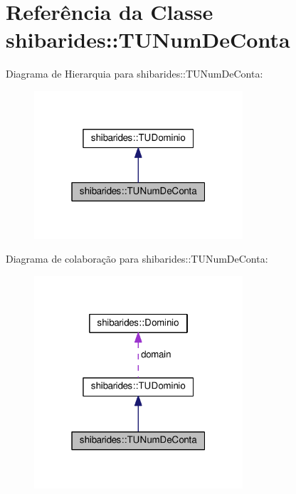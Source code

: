\hypertarget{classshibarides_1_1TUNumDeConta}{}\section{Referência da Classe shibarides\+:\+:T\+U\+Num\+De\+Conta}
\label{classshibarides_1_1TUNumDeConta}


Diagrama de Hierarquia para shibarides\+:\+:T\+U\+Num\+De\+Conta\+:\nopagebreak
\begin{figure}[H]
\begin{center}
\leavevmode
\includegraphics[width=220pt]{classshibarides_1_1TUNumDeConta__inherit__graph}
\end{center}
\end{figure}


Diagrama de colaboração para shibarides\+:\+:T\+U\+Num\+De\+Conta\+:\nopagebreak
\begin{figure}[H]
\begin{center}
\leavevmode
\includegraphics[width=220pt]{classshibarides_1_1TUNumDeConta__coll__graph}
\end{center}
\end{figure}
